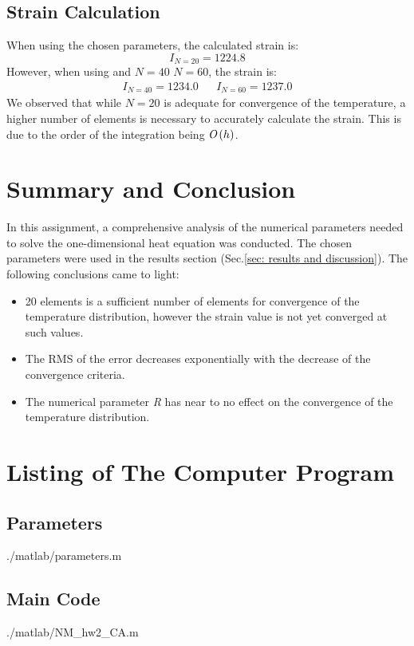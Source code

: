 \documentclass[11pt, a4paper]{article}
\begin{document}
\subsection{Strain Calculation}
When using the chosen parameters, the calculated strain is:
\begin{equation}
    I_{N=20}=1224.8
\end{equation}
However, when using and $N=40$ $N=60$, the strain is:
\begin{equation}
    \begin{matrix}
        I_{N=40}=1234.0 && I_{N=60}=1237.0
    \end{matrix}
\end{equation}
We observed that while $N = 20$ is adequate for convergence of the temperature, a higher number of elements is necessary to accurately calculate the strain. This is due to the order of the integration being $\emph{O}\left(h\right)$. 

\section{Summary and Conclusion}
In this assignment, a comprehensive analysis of the numerical parameters needed to solve the one-dimensional heat equation was conducted. The chosen parameters were used in the results section (Sec.\ref{sec: results and discussion}). The following conclusions came to light:
\begin{itemize}
    \item 20 elements is a sufficient number of elements for convergence of the temperature distribution, however the strain value is not yet converged at such values.
    \item The RMS of the error decreases exponentially with the decrease of the convergence criteria.
    \item The numerical parameter \emph{R} has near to no effect on the convergence of the temperature distribution.
\end{itemize}

\newpage
\appendix
\section{Listing of The Computer Program}
\subsection{Parameters}
\begin{lstinputlisting}[captionpos=b,stringstyle=\color{magenta},frame=single, numbers=left, style=MatLab-editor, basicstyle=\mlttfamily\small, caption={Parameters file},mlshowsectionrules=true]{./matlab/parameters.m}
\end{lstinputlisting}

\subsection{Main Code}
\begin{lstinputlisting}[captionpos=b,stringstyle=\color{magenta},frame=single, numbers=left, style=MatLab-editor, basicstyle=\mlttfamily\small, caption={The main file},mlshowsectionrules=true]{./matlab/NM_hw2_CA.m}
\end{lstinputlisting}
\end{document}
